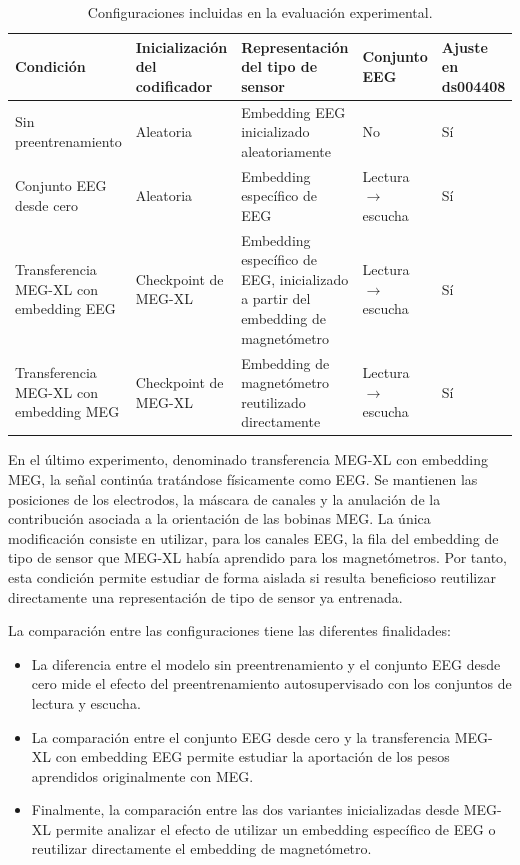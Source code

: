 \begin{table}[htbp]
\centering
\footnotesize
\setlength{\tabcolsep}{4pt}
\renewcommand{\arraystretch}{1.18}
\begin{tabularx}{\textwidth}{
    >{\raggedright\arraybackslash}p{2.6cm}
    >{\raggedright\arraybackslash}p{2.6cm}
    >{\raggedright\arraybackslash}p{3.1cm}
    >{\centering\arraybackslash}p{1.7cm}
    >{\centering\arraybackslash}X
}
\toprule
\textbf{Condición} &
\textbf{Inicialización del codificador} &
\textbf{Representación del tipo de sensor} &
\textbf{Conjunto EEG} &
\textbf{Ajuste en ds004408} \\
\midrule

Sin preentrenamiento &
Aleatoria &
Embedding EEG inicializado aleatoriamente &
No &
Sí \\

Conjunto EEG desde cero &
Aleatoria &
Embedding específico de EEG &
Lectura $\rightarrow$ escucha &
Sí \\

Transferencia MEG-XL con embedding EEG &
Checkpoint de MEG-XL &
Embedding específico de EEG, inicializado a partir del embedding de magnetómetro &
Lectura $\rightarrow$ escucha &
Sí \\

Transferencia MEG-XL con embedding MEG &
Checkpoint de MEG-XL &
Embedding de magnetómetro reutilizado directamente &
Lectura $\rightarrow$ escucha &
Sí \\

\bottomrule
\end{tabularx}
\caption{Configuraciones incluidas en la evaluación experimental.}
\label{tab:condiciones_experimentales}
\end{table}

En el último experimento, denominado transferencia MEG-XL con embedding MEG, la señal continúa tratándose físicamente como EEG. Se mantienen las posiciones de los electrodos, la máscara de canales y la anulación de la contribución asociada a la orientación de las bobinas MEG. La única modificación consiste en utilizar, para los canales EEG, la fila del embedding de tipo de sensor que MEG-XL había aprendido para los magnetómetros. Por tanto, esta condición permite estudiar de forma aislada si resulta beneficioso reutilizar directamente una representación de tipo de sensor ya entrenada.

La comparación entre las configuraciones tiene las diferentes finalidades:
\begin{itemize}
    \item La diferencia entre el modelo sin preentrenamiento y el conjunto EEG desde cero mide el efecto del preentrenamiento autosupervisado con los conjuntos de lectura y escucha.
    \item La comparación entre el conjunto EEG desde cero y la transferencia MEG-XL con embedding EEG permite estudiar la aportación de los pesos aprendidos originalmente con MEG.
    \item Finalmente, la comparación entre las dos variantes inicializadas desde MEG-XL permite analizar el efecto de utilizar un embedding específico de EEG o reutilizar directamente el embedding de magnetómetro.
\end{itemize}  

